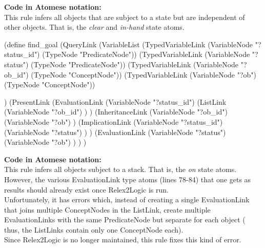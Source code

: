 \begin{footnotesize}
\textbf{Code in Atomese notation:} \\
This rule infers all objects that are subject to a state but are independent of other objects. That is, the \textit{clear} and \textit{in-hand} state atoms.
\end{footnotesize}

\begin{python}
(define find_goal
  (QueryLink
    (VariableList
      (TypedVariableLink 
        (VariableNode "?status_id") 
        (TypeNode "PredicateNode"))
      (TypedVariableLink 
        (VariableNode "?status") 
        (TypeNode "PredicateNode"))
      (TypedVariableLink 
        (VariableNode "?ob_id") 
        (TypeNode "ConceptNode"))
      (TypedVariableLink 
        (VariableNode "?ob") 
        (TypeNode "ConceptNode"))
  
    )
    (PresentLink
      (EvaluationLink
        (VariableNode "?status_id")
        (ListLink
          (VariableNode "?ob_id")
        )
      )
      (InheritanceLink
        (VariableNode "?ob_id")
        (VariableNode "?ob")
      )
      (ImplicationLink
        (VariableNode "?status_id")
        (VariableNode "?status")
      )
    )
    (EvaluationLink
      (VariableNode "?status")
      (VariableNode "?ob")
    )
  )
)
\end{python}

\bigskip

\begin{footnotesize}
\textbf{Code in Atomese notation:} \\
This rule infers all objects subject to a stack. That is, the \textit{on} state atoms. \\
However, the various EvaluationLink type atoms (lines 78-84) that one gets as results should already exist once Relex2Logic is run. \\
Unfortunately, it has errors which, instead of creating a single EvaluationLink that joins multiple ConceptNodes in the ListLink, create multiple EvaluationLinks with the same PredicateNode but separate for each object ( thus, the ListLinks contain only one ConceptNode each). \\
Since Relex2Logic is no longer maintained, this rule fixes this kind of error.
\end{footnotesize}

